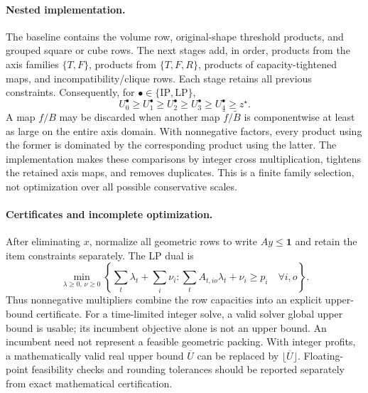 \paragraph{Nested implementation.}
The baseline contains the volume row, original-shape threshold products,
and grouped square or cube rows. The next stages add, in order,
products from the axis families $\{T,F\}$, products from $\{T,F,R\}$,
products of capacity-tightened maps, and incompatibility/clique rows.
Each stage retains all previous constraints. Consequently, for
$\bullet\in\{\mathrm{IP},\mathrm{LP}\}$,
\begin{equation}
 U_0^\bullet\geq U_1^\bullet\geq U_2^\bullet
                      \geq U_3^\bullet\geq U_4^\bullet\geq z^\star.
\end{equation}
A map $f/B$ may be discarded when another map $\widetilde f/\widetilde B$
is componentwise at least as large on the entire axis domain. With
nonnegative factors, every product using the former is dominated by
the corresponding product using the latter. The implementation makes
these comparisons by integer cross multiplication, tightens the
retained axis maps, and removes duplicates. This is a finite family
selection, not optimization over all possible conservative scales.

\paragraph{Certificates and incomplete optimization.}
After eliminating $x$, normalize all geometric rows to write
$Ay\leq\mathbf1$ and retain the item constraints separately. The LP
dual is
\begin{equation}
 \min_{\lambda\geq0,\,\nu\geq0}
 \left\{\sum_t\lambda_t+\sum_i\nu_i:
       \sum_t A_{t,io}\lambda_t+\nu_i\geq p_i
                  \quad\forall i,o\right\}.                  \label{eq:dual}
\end{equation}
Thus nonnegative multipliers combine the row capacities into an
explicit upper-bound certificate. For a time-limited integer solve,
a valid solver global upper bound is usable; its incumbent objective
alone is not an upper bound. An incumbent need not represent a feasible
geometric packing. With integer profits, a mathematically valid real
upper bound $\overline U$ can be replaced by $\lfloor\overline U\rfloor$.
Floating-point feasibility checks and rounding tolerances should be
reported separately from exact mathematical certification.

